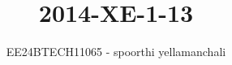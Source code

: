 \documentclass[journal]{IEEEtran}
\begin{document}

\vspace{3cm}

\title{2014-XE-1-13}
\author{EE24BTECH11065 - spoorthi yellamanchali}
{\let\newpage\relax\maketitle}

\renewcommand{\thefigure}{\theenumi}
\renewcommand{\thetable}{\theenumi}
\setlength{\intextsep}{10pt} %


\renewcommand{\thetable}{\theenumi}
\end{document}
